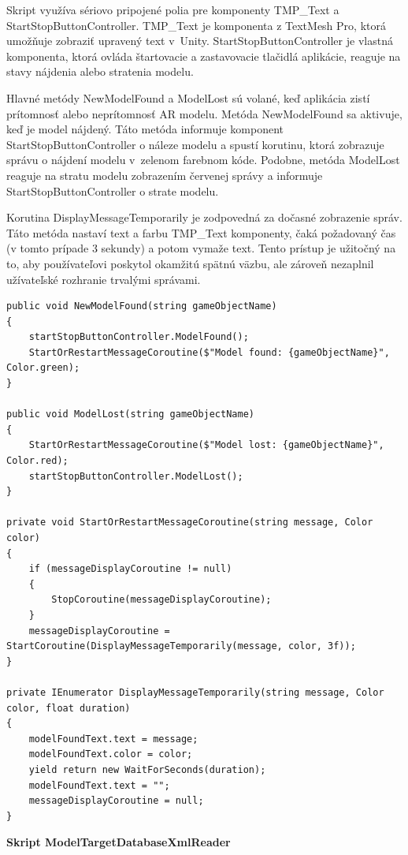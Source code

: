 Skript využíva sériovo pripojené polia pre komponenty TMP\_Text a StartStopButtonController. TMP\_Text je komponenta z TextMesh Pro, ktorá umožňuje zobraziť upravený text v~Unity. StartStopButtonController je vlastná komponenta, ktorá ovláda štartovacie a zastavovacie tlačidlá aplikácie, reaguje na stavy nájdenia alebo stratenia modelu.

Hlavné metódy NewModelFound a ModelLost sú volané, keď aplikácia zistí prítomnosť alebo neprítomnosť AR modelu. Metóda NewModelFound sa aktivuje, keď je model nájdený. Táto metóda informuje komponent StartStopButtonController o náleze modelu a spustí korutinu, ktorá zobrazuje správu o nájdení modelu v~zelenom farebnom kóde. Podobne, metóda ModelLost reaguje na stratu modelu zobrazením červenej správy a informuje StartStopButtonController o strate modelu.

Korutina DisplayMessageTemporarily je zodpovedná za dočasné zobrazenie správ. Táto metóda nastaví text a farbu TMP\_Text komponenty, čaká požadovaný čas (v tomto prípade 3 sekundy) a potom vymaže text. Tento prístup je užitočný na to, aby používateľovi poskytol okamžitú spätnú väzbu, ale zároveň nezaplnil užívateľské rozhranie trvalými správami.

\lstset{style=Csharp}
\begin{lstlisting}[caption={ModelFoundController Class - Ovladanie správ pri nájdeni modelu}, label=changeDatabaseController]
public void NewModelFound(string gameObjectName)
{
    startStopButtonController.ModelFound();
    StartOrRestartMessageCoroutine($"Model found: {gameObjectName}", Color.green);
}

public void ModelLost(string gameObjectName)
{
    StartOrRestartMessageCoroutine($"Model lost: {gameObjectName}", Color.red);
    startStopButtonController.ModelLost();
}

private void StartOrRestartMessageCoroutine(string message, Color color)
{
    if (messageDisplayCoroutine != null)
    {
        StopCoroutine(messageDisplayCoroutine);
    }
    messageDisplayCoroutine = StartCoroutine(DisplayMessageTemporarily(message, color, 3f));
}

private IEnumerator DisplayMessageTemporarily(string message, Color color, float duration)
{
    modelFoundText.text = message;
    modelFoundText.color = color;
    yield return new WaitForSeconds(duration);
    modelFoundText.text = "";
    messageDisplayCoroutine = null;
}
\end{lstlisting} 

{\large\textbf{Skript ModelTargetDatabaseXmlReader}}

